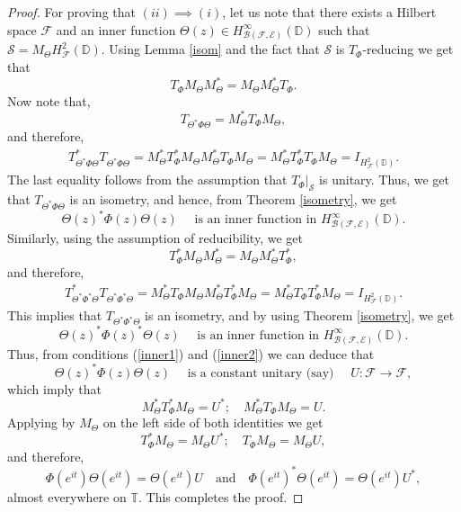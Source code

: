 \documentclass[12pt]{amsart}
\numberwithin{equation}{section}
\theoremstyle{definition}
\newcommand{\D}{\mathbb{D}}
\newcommand{\T}{\mathbb{T}}
\newcommand{\1}{{\mbox{\bf 1}}}
\newcommand{\clb}{\mathcal{B}}
\newcommand{\cle}{\mathcal{E}}
\newcommand{\clf}{\mathcal{F}}
\newcommand{\cls}{\mathcal{S}}
\newcommand{\raro}{\rightarrow}
\begin{document}
\begin{proof}
For proving that $(ii) \implies (i)$, let us note that there exists a Hilbert space $\clf$ and an inner function $\Theta(z) \in H_{\clb(\clf,\cle)}^{\infty}(\D)$ such that $\cls = M_{\Theta} H_{\clf}^2(\D)$. Using Lemma \ref{isom} and the fact that $\cls$ is $T_{\Phi}$-reducing we get that 
\[
T_{\Phi} M_{\Theta}M_{\Theta}^* = M_{\Theta}M_{\Theta}^* T_{\Phi}.
\]
Now note that,
\[
T_{\Theta^* \Phi \Theta} = M_{\Theta}^* T_{\Phi} M_{\Theta},
\]
and therefore,
\begin{align*}
T_{\Theta^* \Phi \Theta}^* T_{\Theta^* \Phi \Theta} =  M_{\Theta}^* T_{\Phi}^* M_{\Theta}M_{\Theta}^* T_{\Phi} M_{\Theta} = M_{\Theta}^* T_{\Phi}^* T_{\Phi} M_{\Theta} = I_{H_{\clf}^2(\D)}.
\end{align*}
The last equality follows from the assumption that $T_{\Phi}|_{\cls}$ is unitary.  Thus, we get that $T_{\Theta^* \Phi \Theta}$ is an isometry, and hence, from Theorem \ref{isometry}, we get
\begin{equation}\label{inner1}
\Theta(z)^*  \Phi(z) \Theta(z) \quad \text{ is an inner function in } H_{\clb(\clf,\cle)}^{\infty}(\D).
\end{equation}
Similarly, using the assumption of reducibility, we get
\[
T_{\Phi}^* M_{\Theta}M_{\Theta}^* = M_{\Theta}M_{\Theta}^* T_{\Phi}^*,
\]
and therefore,
\begin{align*}
T_{\Theta^* \Phi^* \Theta}^* T_{\Theta^* \Phi^* \Theta} =  M_{\Theta}^* T_{\Phi} M_{\Theta} M_{\Theta}^* T_{\Phi}^* M_{\Theta}  = M_{\Theta}^* T_{\Phi} T_{\Phi}^* M_{\Theta} = I_{H_{\clf}^2(\D)}.
\end{align*}
This implies that $T_{\Theta^* \Phi^* \Theta}$ is an isometry, and by using Theorem \ref{isometry}, we get
\begin{equation}\label{inner2}
\Theta(z)^*  \Phi(z)^* \Theta(z) \quad \text{ is an inner function in } H_{\clb(\clf,\cle)}^{\infty}(\D).
\end{equation}
Thus, from conditions (\ref{inner1}) and (\ref{inner2}) we can deduce that 
\[
\Theta(z)^*  \Phi(z) \Theta(z) \quad \text{ is a constant unitary (say) } \quad U:\clf \raro \clf,
\]
which imply that
\[
M_{\Theta}^* T_{\Phi}^* M_{\Theta} = U^*; \quad M_{\Theta}^* T_{\Phi} M_{\Theta} = U.
\]
Applying by $M_{\Theta}$ on the left side of both identities we get
\[
T_{\Phi}^* M_{\Theta} = M_{\Theta} U^*; \quad  T_{\Phi} M_{\Theta} = M_{\Theta} U,
\]
and therefore, 
\[
\Phi(e^{it}) \Theta(e^{it}) = \Theta(e^{it}) U \quad \text{and} \quad  \Phi(e^{it})^* \Theta(e^{it}) = \Theta(e^{it}) U^*,
\]
almost everywhere on $\T$.  This completes the proof.
\end{proof}
\end{document}
